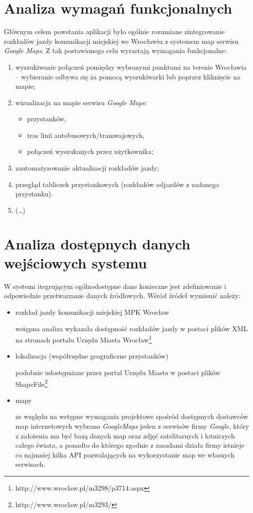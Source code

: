 \documentclass[a4paper,12pt]{article}
\begin{document}
\section{Analiza wymagań funkcjonalnych}
Głównym celem powstania aplikacji było ogólnie rozumiane zintegrowanie
rozkładów jazdy komunikacji miejskiej we Wrocławiu z systemem map serwisu
\emph{Google Maps}. Z tak postawionego celu wyrastają wymagania funkcjonalne:
\begin{enumerate}
  \item wyszukiwanie połączeń pomiędzy wybranymi punktami na terenie Wrocławia
  -- wybieranie odbywa się za pomocą wyszukiwarki lub poprzez kliknięcie na
  mapie;
  \item wizualizacja na mapie serwisu \emph{Google Maps}:
  \begin{itemize}
    \item przystanków,
    \item tras linii autobusowych/tramwajowych,
    \item połączeń wyszukanych przez użytkownika;
  \end{itemize}
  \item zautomatyzowanie aktualizacji rozkładów jazdy;
  \item przegląd tabliczek przystankowych (rozkładów odjazdów z zadanego
  przystanku).
  \item (\ldots)
\end{enumerate}
\section{Analiza dostępnych danych wejściowych systemu}
W systemi itegrującym ogólnodostępne dane konieczne jest zdefiniowanie i
odpowiednie przetwarzanie danych źródłowych. Wśród źródeł wymienić należy:
\begin{itemize}
  \item rozkład jazdy komunikacji miejskiej MPK Wrocław
  
  wstępna analiza wykazała dostępność rozkładów jazdy w postaci plików XML
  na stronach portalu Urzędu Miasta
  Wrocław\footnote{http://www.wroclaw.pl/m3298/p3714.aspx}
  \item lokalizacja (współrzędne geograficzne przystanków)

   podobnie udostępniane przez portal Urzędu Miasta w postaci plików
   ShapeFile\footnote{http://www.wroclaw.pl/m3293/}
  \item mapy 
  
  ze względu na wstępne wymagania projektowe spośród dostępnych dostawców map
  internetowych wybrano \emph{GoogleMaps} jeden z serwisów firmy \emph{Google},
  który z założenia ma być bazą danych map oraz zdjęć satelitarnych i
  lotniczych całego świata, a ponadto do którego zgodnie z zasadami działa
  firmy istnieje co najmniej kilka API pozwalających na wykorzystanie map we
  własnych serwisach.
\end{itemize}
\end{document}
